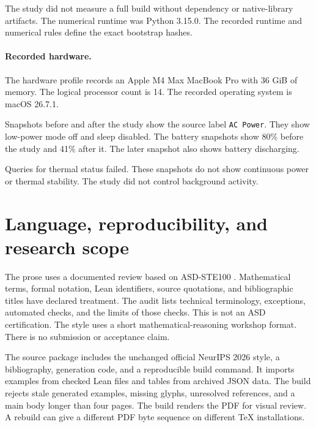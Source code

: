 The study did not measure a full build without dependency or native-library artifacts.
The numerical runtime was Python 3.15.0.
The recorded runtime and numerical rules define the exact bootstrap hashes.

\paragraph{Recorded hardware.}
The hardware profile records an Apple M4 Max MacBook Pro with 36 GiB of memory.
The logical processor count is 14.
The recorded operating system is macOS 26.7.1.

Snapshots before and after the study show the source label \texttt{AC Power}.
They show low-power mode off and sleep disabled.
The battery snapshots show 80\% before the study and 41\% after it.
The later snapshot also shows battery discharging.

Queries for thermal status failed.
These snapshots do not show continuous power or thermal stability.
The study did not control background activity.

\section{Language, reproducibility, and research scope}
The prose uses a documented review based on ASD-STE100 \citep{ste100}.
Mathematical terms, formal notation, Lean identifiers, source quotations, and bibliographic titles have declared treatment.
The audit lists technical terminology, exceptions, automated checks, and the limits of those checks.
This is not an ASD certification.
The style uses a short mathematical-reasoning workshop format.
There is no submission or acceptance claim.

The source package includes the unchanged official NeurIPS 2026 style, a bibliography, generation code, and a reproducible build command.
It imports examples from checked Lean files and tables from archived JSON data.
The build rejects stale generated examples, missing glyphs, unresolved references, and a main body longer than four pages.
The build renders the PDF for visual review.
A rebuild can give a different PDF byte sequence on different TeX installations.
